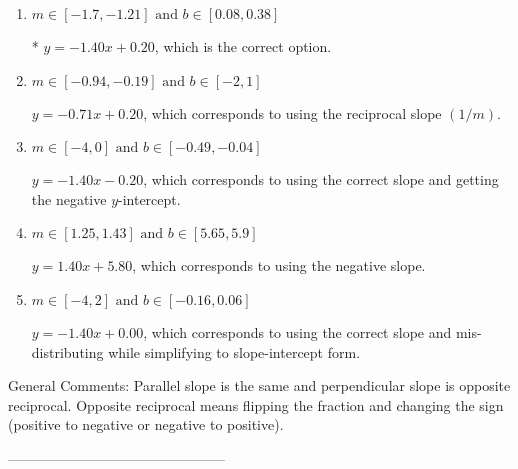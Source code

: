 \documentclass{article}[14pt]
\begin{document}
\begin{enumerate}[label=\Alph*.] 
\item $ m \in [-1.7, -1.21] \text{ and } b \in [0.08, 0.38] $ 

 * $y = -1.40x + 0.20$, which is the correct option. 
\item $ m \in [-0.94, -0.19] \text{ and } b \in [-2, 1] $ 

  $y = -0.71x + 0.20$, which corresponds to using the reciprocal slope $(1/m)$. 
\item $ m \in [-4, 0] \text{ and } b \in [-0.49, -0.04] $ 

  $y = -1.40x - 0.20$, which corresponds to using the correct slope and getting the negative $y$-intercept. 
\item $ m \in [1.25, 1.43] \text{ and } b \in [5.65, 5.9] $ 

  $y = 1.40x + 5.80$, which corresponds to using the negative slope. 
\item $ m \in [-4, 2] \text{ and } b \in [-0.16, 0.06] $ 

  $y = -1.40x + 0.00$, which corresponds to using the correct slope and mis-distributing while simplifying to slope-intercept form. 
\end{enumerate} 
 
General Comments: Parallel slope is the same and perpendicular slope is opposite reciprocal. Opposite reciprocal means flipping the fraction and changing the sign (positive to negative or negative to positive).

-----------------------------------------------
\end{document}
